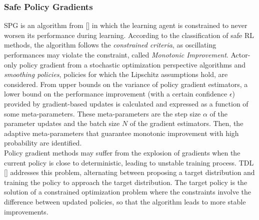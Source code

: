 \subsubsection{Safe Policy Gradients} \label{subsec:safepg}
\acf{SPG} is an algorithm from [\cite{papini2019}] in which the learning agent is constrained to never worsen its performance during learning. According to the classification of safe \ac{RL} methods, the algorithm follows the \emph{constrained criteria}, as oscillating performances may violate the constraint, called \emph{Monotonic Improvement}. Actor-only policy gradient from a stochastic optimization perspective algorithms and \emph{smoothing policies}, \ie policies for which the Lipschitz assumptions hold, are considered. From upper bounds on the variance of policy gradient estimators, a lower bound on the performance improvement (with a certain confidence $\epsilon$) provided by gradient-based updates is calculated and expressed as a function of some meta-parameters. These meta-parameters are the step size $\alpha$ of the parameter updates and the batch size $N$ of the gradient estimators. Then, the adaptive meta-parameters that guarantee monotonic improvement with high probability are identified.\\
\newline 
Policy gradient methods may suffer from the explosion of gradients when the current policy is close to deterministic, leading to unstable training process. \acf{TDL} [\cite{DBLP:journals/corr/abs-1905-11041}] addresses this problem, alternating between proposing a target distribution and training the policy to approach the target distribution. The target policy is the solution of a constrained optimization problem where the constraints involve the difference between updated policies, so that the algorithm leads to more stable improvements.